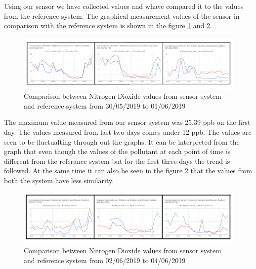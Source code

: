    
   
Using our sensor we have collected values and whave compared it to the values from the reference system. The graphical measurement values of the sensor in comparison with the reference system is shown in  the figure \ref{Nitrogen} and \ref{Nitrogen1}. 


   \begin{figure}[h]
      \begin{center}
      \includegraphics[scale=0.70]{images/figure23.png}
      \end{center}
      \caption{Comparison between Nitrogen Dioxide values from sensor system and reference system from 30/05/2019 to 01/06/2019}
    \label{Nitrogen}
  \end{figure}


  \bigskip

The maximum value measured from our sensor system was 25.39 ppb on the first day. The values measured from last two days comes under 12 ppb. The values are seen to be fluctualting through out the graphs. It can be interpreted from the graph that even though the values of the pollutant at each point of time is different from the referance system but for the first three days the trend is followed. At the same time it can also be seen in the figure \ref{Nitrogen1} that the values from both the system have less similarity.

    \begin{figure}[h]
      \begin{center}
      \includegraphics[scale=0.70]{images/figure24.png}
      \end{center}
      \caption{Comparison between Nitrogen Dioxide values from sensor system and reference system from 02/06/2019 to 04/06/2019}
      \label{Nitrogen1}
    \end{figure}


